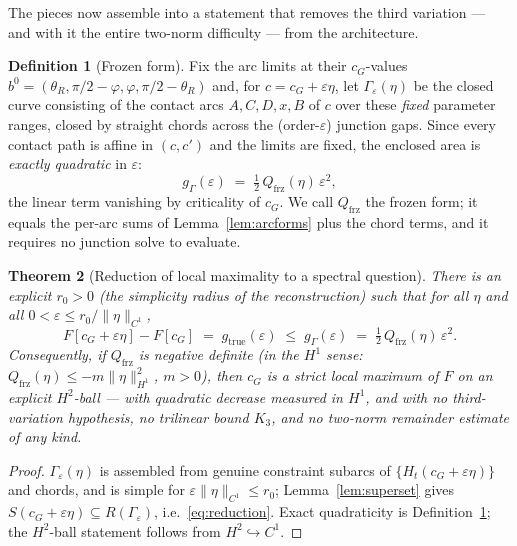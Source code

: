 \documentclass[11pt]{amsart}
\theoremstyle{plain}
\newtheorem{theorem}{Theorem}
\theoremstyle{definition}
\newtheorem{definition}[theorem]{Definition}
\newcommand{\cG}{c_{G}}
\begin{document}
The pieces now assemble into a statement that removes the third
variation --- and with it the entire two-norm difficulty --- from the
architecture.

\begin{definition}[Frozen form]\label{def:frozen}
Fix the arc limits at their $\cG$-values
$b^{0}=(\theta_{R},\pi/2-\varphi,\varphi,\pi/2-\theta_{R})$ and, for
$c=\cG+\varepsilon\eta$, let $\Gamma_{\varepsilon}(\eta)$ be the closed
curve consisting of the contact arcs $A,C,D,x,B$ of $c$ over these
\emph{fixed} parameter ranges, closed by straight chords across the
(order-$\varepsilon$) junction gaps.  Since every contact path is
affine in $(c,c')$ and the limits are fixed, the enclosed area is
\emph{exactly quadratic} in $\varepsilon$:
\[
   g_{\Gamma}(\varepsilon)
   \;=\; \tfrac12\,Q_{\mathrm{frz}}(\eta)\,\varepsilon^{2},
\]
the linear term vanishing by criticality of $\cG$.  We call
$Q_{\mathrm{frz}}$ the frozen form; it equals the per-arc sums of
Lemma~\ref{lem:arcforms} plus the chord terms, and it requires no
junction solve to evaluate.
\end{definition}

\begin{theorem}[Reduction of local maximality to a spectral question]
\label{thm:reduction}
There is an explicit $r_{0}>0$ (the simplicity radius of the
reconstruction) such that for all $\eta$ and all
$0<\varepsilon\leq r_{0}/\|\eta\|_{C^{1}}$,
\begin{equation}\label{eq:reduction}
   F[\cG+\varepsilon\eta] - F[\cG]
   \;=\; g_{\mathrm{true}}(\varepsilon)
   \;\leq\; g_{\Gamma}(\varepsilon)
   \;=\; \tfrac12\,Q_{\mathrm{frz}}(\eta)\,\varepsilon^{2}.
\end{equation}
Consequently, \emph{if} $Q_{\mathrm{frz}}$ is negative definite
(in the $H^{1}$ sense: $Q_{\mathrm{frz}}(\eta)\leq
-m\|\eta\|^{2}_{H^{1}}$, $m>0$), \emph{then} $\cG$ is a strict local
maximum of $F$ on an explicit $H^{2}$-ball --- with quadratic decrease
measured in $H^{1}$, and with \emph{no} third-variation hypothesis, no
trilinear bound $K_{3}$, and no two-norm remainder estimate of any
kind.
\end{theorem}

\begin{proof}
$\Gamma_{\varepsilon}(\eta)$ is assembled from genuine constraint
subarcs of $\{H_{t}(\cG+\varepsilon\eta)\}$ and chords, and is simple
for $\varepsilon\|\eta\|_{C^{1}}\leq r_{0}$; Lemma~\ref{lem:superset}
gives $S(\cG+\varepsilon\eta)\subseteq R(\Gamma_{\varepsilon})$, i.e.\
\eqref{eq:reduction}.  Exact quadraticity is
Definition~\ref{def:frozen}; the $H^{2}$-ball statement follows from
$H^{2}\hookrightarrow C^{1}$.
\end{proof}
\end{document}
